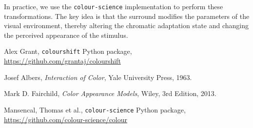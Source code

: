 \documentclass[11pt]{article}
\begin{document}
In practice, we use the \texttt{colour-science} implementation to perform these transformations. The key idea is that the surround modifies the parameters of the visual environment, thereby altering the chromatic adaptation state and changing the perceived appearance of the stimulus.


\begin{thebibliography}{9}
Alex Grant,
\texttt{colourshift} Python package, 
\url{https://github.com/grantaj/colourshift}

Josef Albers,
\textit{Interaction of Color},
Yale University Press, 1963.

Mark D. Fairchild,
\textit{Color Appearance Models},
Wiley, 3rd Edition, 2013.

Mansencal, Thomas et al.,
\texttt{colour-science} Python package,
\url{https://github.com/colour-science/colour}
\end{thebibliography}
\end{document}
